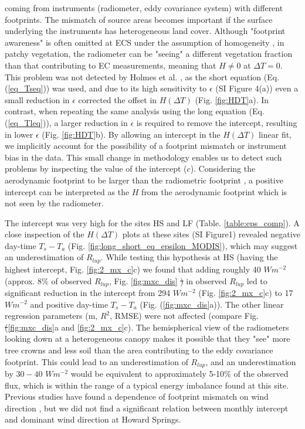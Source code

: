 \documentclass[fleqn,10pt]{wlscirep}
\providecommand{\DIFaddtex}[1]{{\protect\color{blue}\uwave{#1}}} %
\providecommand{\DIFdeltex}[1]{{\protect\color{red}\sout{#1}}}                      %
\providecommand{\DIFaddbegin}{} %
\providecommand{\DIFaddend}{} %
\providecommand{\DIFdelbegin}{} %
\providecommand{\DIFdelend}{} %
\providecommand{\DIFadd}[1]{\texorpdfstring{\DIFaddtex{#1}}{#1}} %
\providecommand{\DIFdel}[1]{\texorpdfstring{\DIFdeltex{#1}}{}} %
\begin{document}
coming from instruments (radiometer, eddy covariance system) with different footprints\cite{marcolla2018geometry}. The mismatch of source areas becomes important if the surface underlying the instruments has heterogeneous land cover. 
 Although "footprint awareness" is often omitted at ECS under the assumption of ho­mogeneity \cite{chu2021representativeness}, in patchy vegetation, the radiometer can be "seeing" a different vegetation fraction than that contributing to EC measurements, meaning that $H\not= 0$ at $\Delta T=0$. This problem was not detected by Holmes et al. \cite{holmes2009land}, as the short equation (Eq. (\ref{eq_Tseq})) was used, and due to its high sensitivity to $\epsilon$ (SI Figure 4(a)) even a small reduction in $\epsilon$ corrected the offset in $H(\Delta T)$ (Fig. \ref{fig:HDT}a). In contrast, when repeating the same analysis using the long equation (Eq. (\ref{eq_Tleq})), a larger reduction in $\epsilon$ is required to remove the intercept, resulting in lower $\epsilon$ (Fig. \ref{fig:HDT}b). By allowing an intercept in the $H(\Delta T)$ linear fit, we implicitly account for the possibility of a footprint mismatch or instrument bias in the data. This small change in methodology enables us to detect such problems by inspecting the value of the intercept ($c$). Considering  the aerodynamic footprint to be larger than the radiometric footprint \cite{marcolla2018geometry,chu2021representativeness}, a positive intercept can be interpreted as the $H$ from the aerodynamic footprint which is not seen by the radiometer. 

The intercept was very high for the sites HS and LF (Table. \ref{table:eps_comp}). A close inspection of the $H(\Delta T)$ plots at these sites (SI Figure1) revealed negative day-time \DIFdelbegin \DIFdel{$T_{s} -T_{a}$ }\DIFdelend \DIFaddbegin \DIFadd{$T_{s} - T_{a}$ }\DIFaddend (Fig. \ref{fig:long_short_eq_epsilon_MODIS}), which may suggest an underestimation of $R_{lup}$. While testing this hypothesis at HS (having the highest intercept, Fig. \ref{fig:2_mx_c}c) we found that adding roughly 40 $Wm^{-2}$ (approx. 8\% of observed $R_{lup}$, Fig. \ref{fig:mxc_dis} \DIFdelbegin \DIFdel{) }\DIFdelend in observed $R_{lup}$ led to significant reduction in the intercept from 294 $Wm^{-2}$ (Fig. \ref{fig:2_mx_c}c) to 17 $Wm^{-2}$ and positive day-time $T_{s} - T_{a}$ (Fig. (\ref{fig:mxc_dis}a)). The other linear regression parameters (m, $R^{2}$, RMSE) were not affected (compare Fig. \DIFdelbegin \DIFdel{(}\DIFdelend \ref{fig:mxc_dis}a and \DIFaddbegin \DIFadd{Fig. }\DIFaddend \ref{fig:2_mx_c}c). The hemispherical view of the radiometers looking down at a heterogeneous canopy makes it possible that they "see" more tree crowns and less soil than the area contributing to the eddy covariance footprint. This could lead to an underestimation of $R_{lup}$, and an underestimation by $30-40$ $Wm^{-2}$ would be equivalent to approximately 5-10$\%$ of the observed flux, which is within the range of a typical energy imbalance found at this site. Previous studies have found a dependence of footprint mismatch on wind direction \cite{chu2021representativeness,marcolla2018geometry,morillas2013using}, but we did not find a significant relation between monthly intercept and dominant wind direction at Howard Springs.
\end{document}
